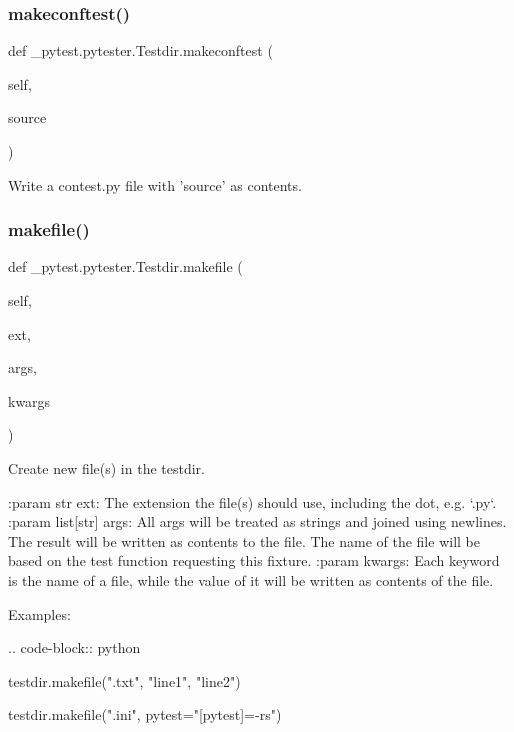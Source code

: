 \subsubsection{\texorpdfstring{makeconftest()}{makeconftest()}}
{\footnotesize\ttfamily def \+\_\+pytest.\+pytester.\+Testdir.\+makeconftest (\begin{DoxyParamCaption}\item[{}]{self,  }\item[{}]{source }\end{DoxyParamCaption})}

\begin{DoxyVerb}Write a contest.py file with 'source' as contents.\end{DoxyVerb}
 \mbox{\label{class__pytest_1_1pytester_1_1_testdir_a8f4d8c98a81eaeb7b78e549625c8b9a1}} 
\subsubsection{\texorpdfstring{makefile()}{makefile()}}
{\footnotesize\ttfamily def \+\_\+pytest.\+pytester.\+Testdir.\+makefile (\begin{DoxyParamCaption}\item[{}]{self,  }\item[{}]{ext,  }\item[{}]{args,  }\item[{}]{kwargs }\end{DoxyParamCaption})}

\begin{DoxyVerb}Create new file(s) in the testdir.

:param str ext: The extension the file(s) should use, including the dot, e.g. `.py`.
:param list[str] args: All args will be treated as strings and joined using newlines.
   The result will be written as contents to the file.  The name of the
   file will be based on the test function requesting this fixture.
:param kwargs: Each keyword is the name of a file, while the value of it will
   be written as contents of the file.

Examples:

.. code-block:: python

    testdir.makefile(".txt", "line1", "line2")

    testdir.makefile(".ini", pytest="[pytest]\naddopts=-rs\n")\end{DoxyVerb}
 \mbox{\label{class__pytest_1_1pytester_1_1_testdir_a7211f0bf717acac6697a052de659083f}} 
